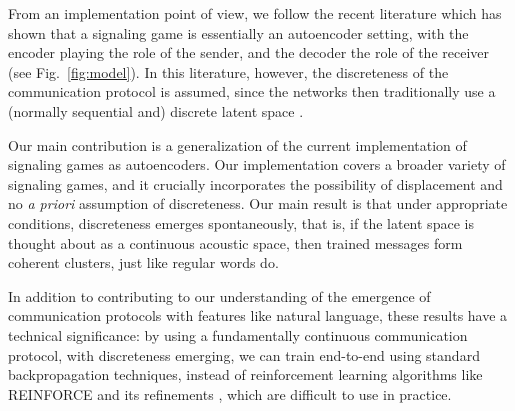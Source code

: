 \documentclass[11pt,a4paper]{article}
\newcommand{\nbEC}[1]{{\leavevmode\color{blue}{\scriptsize#1}}}
\begin{document}
From an implementation point of view, we follow the recent literature which has shown that a signaling game is essentially an autoencoder setting, with the encoder playing the role of the sender, and the decoder the role of the receiver (see Fig.~\ref{fig:model}). In this literature, however, the discreteness of the communication protocol is assumed, since the networks then traditionally use a (normally sequential and) discrete latent space \citep{Havrylov2017, Chaabouni2019a, Kharitonov2019}.  


Our main contribution is a generalization of the current implementation of signaling games as autoencoders.
Our implementation covers a broader variety of signaling games, and it crucially incorporates the possibility of displacement and no \emph{a priori} assumption of discreteness. %
Our main result is that under appropriate conditions, discreteness emerges spontaneously, that is, if the latent space is thought about as a continuous acoustic space, then trained messages form coherent clusters, just like regular words do.

In addition to contributing to our understanding of the emergence of communication protocols with features like natural language, these results have a technical significance: by using a fundamentally continuous communication protocol, with discreteness emerging, we can train end-to-end using standard backpropagation techniques, instead of reinforcement learning algorithms like REINFORCE and its refinements \citep{Williams1992, Schulman2015, Mnih2016}, which are difficult to use in practice.
\end{document}
